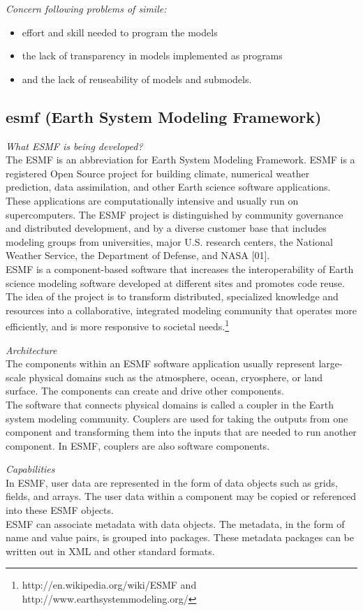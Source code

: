 \emph{Concern following problems of simile:}
\begin{itemize}
	\item effort and skill needed to program the models
	\item the lack of transparency in models implemented as programs
	\item and the lack of reuseability of models and submodels.
\end{itemize}	
	
\subsection{esmf (Earth System Modeling Framework)}
\emph{What ESMF is being developed?}\\
The ESMF is an abbreviation for Earth System Modeling Framework. ESMF is a registered Open Source project for building climate, numerical weather prediction, data assimilation, and other Earth science software applications. These applications are computationally intensive and usually run on supercomputers. The ESMF project is distinguished by community governance and distributed development, and by a diverse customer base that includes modeling groups from universities, major U.S. research centers, the National Weather Service, the Department of Defense, and NASA [01].\\
ESMF is a component-based software that increases the interoperability of Earth science modeling software developed at different sites and promotes code reuse. The idea of the project is to transform distributed, specialized knowledge and resources into a collaborative, integrated modeling community that operates more efficiently, and is more responsive to societal needs.\footnote{http://en.wikipedia.org/wiki/ESMF and http://www.earthsystemmodeling.org/}

\emph{Architecture}\\
The components within an ESMF software application usually represent large-scale physical domains such as the atmosphere, ocean, cryosphere, or land surface. The components can create and drive other components.\\
The software that connects physical domains is called a coupler in the Earth system modeling community. Couplers are used for taking the outputs from one component and transforming them into the inputs that are needed to run another component. In ESMF, couplers are also software components.

\emph{Capabilities}\\
In ESMF, user data are represented in the form of data objects such as grids, fields, and arrays. The user data within a component may be copied or referenced into these ESMF objects.\\
ESMF can associate metadata with data objects. The metadata, in the form of name and value pairs, is grouped into packages. These metadata packages can be written out in XML and other standard formats.

